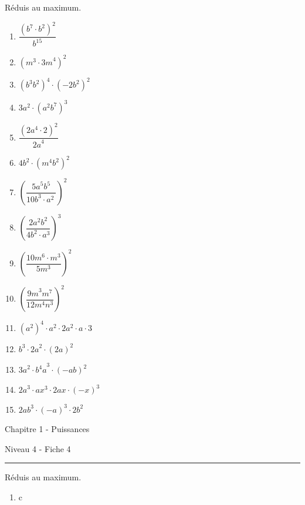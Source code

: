 \begin{exercise}
  Réduis au maximum.
  \begin{enumerate}[cols=3]

    \item \(\dfrac{\left( b^{7} \cdot b^{2} \right)^{2}}{b^{15}}\)
    \item \(\left( m^{3} \cdot {3m}^{4} \right)^{2}\)
    \item \(\left( b^{3}b^{2} \right)^{4} \cdot \left( - 2b^{2} \right)^{2}\)
    \item \({3a^{2} \cdot \left( a^{2}b^{7} \right)}^{3}\)
    \item \(\dfrac{\left( 2a^{4} \cdot 2 \right)^{2}}{{2a}^{4}}\)
    \item \({4b^{2} \cdot \left( m^{4}b^{2} \right)}^{2}\)
    \item \(\left( \dfrac{{5a}^{5}b^{5}}{10b^{3} \cdot a^{2}\ } \right)^{2}\)
    \item \(\left( \dfrac{2a^{2}b^{2}}{4b^{2} \cdot a^{3}} \right)^{3}\)
    \item \(\left( \dfrac{10m^{6} \cdot m^{3}}{5m^{3}} \right)^{2}\)
    \item \(\left( \dfrac{{9m}^{3}m^{7}}{12m^{4}n^{3}} \right)^{2}\)
    \item \(\left( a^{2} \right)^{4} \cdot a^{2} \cdot 2a^{2} \cdot a \cdot 3\)
    \item \(b^{3} \cdot {2a}^{2} \cdot (2a)^{2}\)
    \item \({3a}^{2} \cdot {b^{4}a}^{3} \cdot ( - ab)^{2}\)
    \item \({2a}^{3} \cdot {ax}^{3} \cdot 2ax \cdot ( - x)^{3}\)
    \item \({2ab}^{3} \cdot ( - a)^{3} \cdot {2b}^{2} \)
    
  \end{enumerate}
\end{exercise}

\newpage
\begin{center}
  \bfseries
  \begin{Huge}
    Chapitre 1 - Puissances
  \end{Huge}
  \smallbreak
  \begin{large}
    Niveau 4  - Fiche 4
  \end{large}
  \smallbreak
  \rule[10pt]{.5\linewidth}{1 pt}
\end{center}

\setcounter{exercise}{0}

\begin{exercise}
  Réduis au maximum. 
  \begin{enumerate}[cols=3]
    \item c
    
  \end{enumerate}
\end{exercise}


